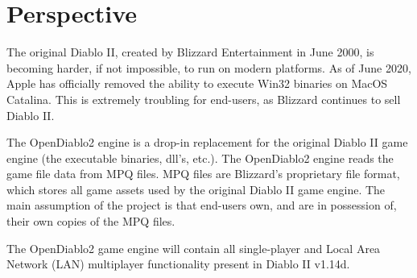 \section{Perspective} \label{sec:product_perspective}


The original Diablo II, created by Blizzard Entertainment in June 2000, is
becoming harder, if not impossible, to run on modern platforms. As of June 2020,
Apple has officially removed the ability to execute Win32 binaries on MacOS
Catalina. This is extremely troubling for end-users, as Blizzard continues to
sell Diablo II.

The OpenDiablo2 engine is a drop-in replacement for the original Diablo II game
engine (the executable binaries, dll's, etc.). The OpenDiablo2 engine reads the
game file data from MPQ files. MPQ files are Blizzard's proprietary file format,
which stores all game assets used by the original Diablo II game engine. The
main assumption of the project is that end-users own, and are in possession of,
their own copies of the MPQ files.

The OpenDiablo2 game engine will contain all single-player and Local Area Network 
(LAN) multiplayer functionality present in Diablo II v1.14d.
